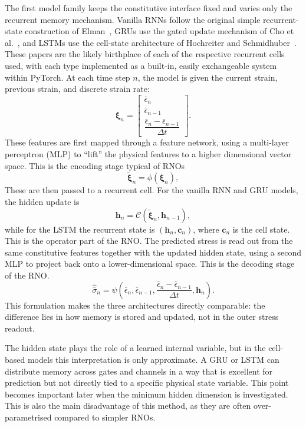 \documentclass[11pt,a4paper, onecolumn]{article}
\newcommand{\epsbar}{\bar{\epsilon}}
\newcommand{\sigbar}{\bar{\sigma}}
\newcommand{\dt}{\Delta t}
\begin{document}
The first model family keeps the constitutive interface fixed and varies only the recurrent memory mechanism. Vanilla RNNs follow the original simple recurrent-state construction of Elman~\cite{elman1990}, GRUs use the gated update mechanism of Cho et al.~\cite{cho2014}, and LSTMs use the cell-state architecture of Hochreiter and Schmidhuber~\cite{hochreiter1997}. These papers are the likely birthplace of each of the respective recurrent cells used, with each type implemented as a built-in, easily exchangeable system within PyTorch. At each time step $n$, the model is given the current strain, previous strain, and discrete strain rate:
\begin{equation}
\bm{\xi}_n=
\begin{bmatrix}
\epsbar_n\\
\epsbar_{n-1}\\
\dfrac{\epsbar_n-\epsbar_{n-1}}{\dt}
\end{bmatrix}.
\label{eq:step_features}
\end{equation}
These features are first mapped through a feature network, using a multi-layer perceptron (MLP) to ``lift'' the physical features to a higher dimensional vector space. This is the encoding stage typical of RNOs
\begin{equation}
\tilde{\bm{\xi}}_n=\phi(\bm{\xi}_n),
\label{eq:feature_network}
\end{equation}
These are then passed to a recurrent cell. For the vanilla RNN and GRU models, the hidden update is
\begin{equation}
\bm{h}_n=\mathcal{C}\!\left(\tilde{\bm{\xi}}_n,\bm{h}_{n-1}\right),
\label{eq:cell_update}
\end{equation}
while for the LSTM the recurrent state is $(\bm{h}_n,\bm{c}_n)$, where $\bm{c}_n$ is the cell state. This is the operator part of the RNO. The predicted stress is read out from the same constitutive features together with the updated hidden state, using a second MLP to project back onto a lower-dimensional space. This is the decoding stage of the RNO.
\begin{equation}
\hat{\sigbar}_n=\psi\!\left(\epsbar_n,\epsbar_{n-1},\frac{\epsbar_n-\epsbar_{n-1}}{\dt},\bm{h}_n\right).
\label{eq:cell_readout}
\end{equation}
This formulation makes the three architectures directly comparable: the difference lies in how memory is stored and updated, not in the outer stress readout.

The hidden state plays the role of a learned internal variable, but in the cell-based models this interpretation is only approximate. A GRU or LSTM can distribute memory across gates and channels in a way that is excellent for prediction but not directly tied to a specific physical state variable. This point becomes important later when the minimum hidden dimension is investigated. This is also the main disadvantage of this method, as they are often over-parametrised compared to simpler RNOs.
\end{document}
